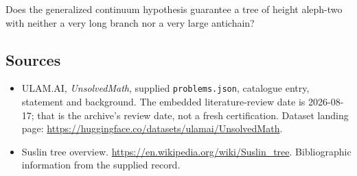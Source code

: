 \documentclass[11pt,a4paper]{article}
\begin{document}
Does the generalized continuum hypothesis guarantee a tree of height aleph-two with neither a very long branch nor a very large antichain?

\subsection{Sources}

{\small

\begin{itemize}

\item[\hypertarget{source:statement:1}{S1}] ULAM.AI, \emph{UnsolvedMath}, supplied \texttt{problems.json}, catalogue entry, statement and background. The embedded literature-review date is 2026-08-17; that is the archive’s review date, not a fresh certification. Dataset landing page: \url{https://huggingface.co/datasets/ulamai/UnsolvedMath}.

\item[\hypertarget{source:statement:2}{S2}] Suslin tree overview. \url{https://en.wikipedia.org/wiki/Suslin_tree}. Bibliographic information from the supplied record.

\end{itemize}

}

\label{end:statement}
\end{document}
